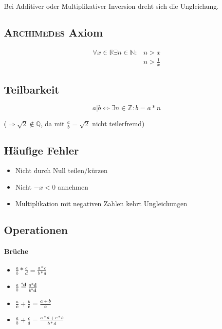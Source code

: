 Bei Additiver oder Multiplikativer Inversion dreht sich die Ungleichung.

\subsection{\textsc{Archimedes} Axiom}

\begin{align*}
      \forall x \in \mathbb{R} \exists n \in \mathbb{N}: & n > x           \\
                                                         & n > \frac{1}{x}
\end{align*}

\subsection{Teilbarkeit}

$$a | b \Leftrightarrow \exists n \in \mathbb{Z}: b = a * n$$

($\Rightarrow \sqrt{2} \notin \mathbb{Q}$, da mit $\frac{a}{b} = \sqrt{2}$ nicht teilerfremd)

\subsection{Häufige Fehler}

\begin{itemize}
      \item Nicht durch Null teilen/kürzen

      \item Nicht $-x < 0$ annehmen

      \item Multiplikation mit negativen Zahlen kehrt Ungleichungen
\end{itemize}

\subsection{Operationen}

\paragraph{Brüche}

\begin{itemize}
      \item $\frac{a}{b} * \frac{c}{d} = \frac{a * c}{b * d}$

      \item $\frac{a}{b} \overset{\mathbf{* d}}{=} \frac{a \mathbf{* d}}{b \mathbf{* d}}$

      \item $\frac{a}{\mathbf{c}} + \frac{b}{\mathbf{c}} = \frac{a + b}{\mathbf{c}}$

      \item $\frac{a}{b} + \frac{c}{d} = \frac{a * d + c * b}{b * d}$
\end{itemize}

